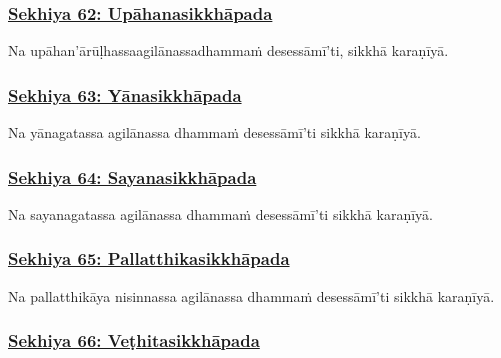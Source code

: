 \subsubsection*{\hyperref[training62]{Sekhiya 62: Upāhanasikkhāpada}}
\label{sekh62}

Na upāhan'ārūḷhassa\makeatletter\hyperlink{endnote515-appendix}\makeatother \thinspace agilānassa\makeatletter\hyperlink{endnote-appendix}\makeatother \thinspace dhammaṁ desessāmī'ti, sikkhā karaṇīyā.



\subsubsection*{\hyperref[training63]{Sekhiya 63: Yānasikkhāpada}}
\label{sekh63}

Na yānagatassa agilānassa dhammaṁ desessāmī'ti sikkhā karaṇīyā.



\subsubsection*{\hyperref[training64]{Sekhiya 64: Sayanasikkhāpada}}
\label{sekh64}

Na sayanagatassa agilānassa dhammaṁ desessāmī'ti sikkhā karaṇīyā.



\subsubsection*{\hyperref[training65]{Sekhiya 65: Pallatthikasikkhāpada}}
\label{sekh65}

Na pallatthikāya nisinnassa agilānassa dhammaṁ desessāmī'ti sikkhā karaṇīyā.



\subsubsection*{\hyperref[training66]{Sekhiya 66: Veṭhitasikkhāpada}}
\label{sekh66}

